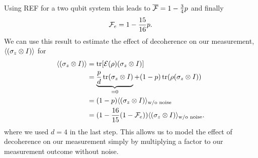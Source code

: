 Using REF for a two qubit system this leads to $\overline{\mathcal{F}}=1-\frac{3}{4}p$ and finally
\begin{equation}
\mathcal{F}_e=1-\frac{15}{16}p.
\end{equation}
We can use this result to estimate the effect of decoherence on our measurement, $\langle(\sigma_z \otimes I )\rangle$ for
\begin{align}
\langle(\sigma_z \otimes I)\rangle &=\mathrm{tr}{[\mathcal{E}(\rho) (\sigma_z \otimes I)]} \\
                     &=\underbrace{\frac{p}{d}\, \mathrm{tr}{(\sigma_z \otimes I)}}_{=0}+(1-p) \, \mathrm{tr} (\rho (\sigma_z \otimes I))\\
                     &=(1-p)\langle(\sigma_z \otimes I)\rangle_{\text{w/o noise}}\\
                     &=(1-\frac{16}{15}(1-\mathcal{F}_e)) \langle(\sigma_z \otimes I)\rangle_{\text{w/o noise}}.
\end{align}
where we used $d=4$ in the last step. This allows us to model the effect of decoherence on our measurement simply by multiplying a factor to our measurement outcome without noise. 

